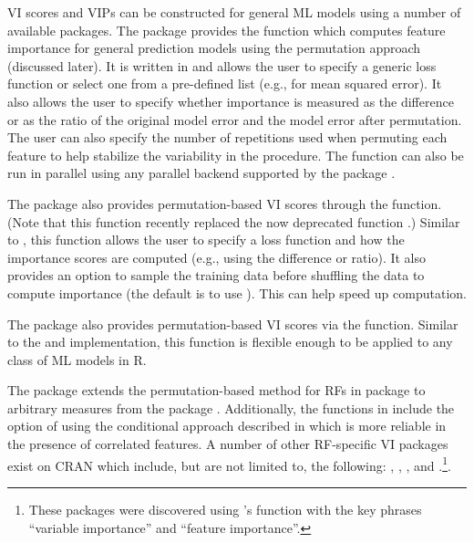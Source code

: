 VI scores and VIPs can be constructed for general ML models using a
number of available packages. The  package \citep{R-iml}
provides the  function which computes feature
importance for general prediction models using the permutation approach
(discussed later). It is written in  \citep{R-R6} and allows
the user to specify a generic loss function or select one from a
pre-defined list (e.g.,  for mean squared error). It
also allows the user to specify whether importance is measured as the
difference or as the ratio of the original model error and the model
error after permutation. The user can also specify the number of
repetitions used when permuting each feature to help stabilize the
variability in the procedure. The  function can
also be run in parallel using any parallel backend supported by the
 package \citep{R-foreach}.

The  package \citep{R-ingredients} also provides
permutation-based VI scores through the 
function. (Note that this function recently replaced the now deprecated
 function  \citep{R-DALEX}.)
Similar to , this function allows the user to
specify a loss function and how the importance scores are computed
(e.g., using the difference or ratio). It also provides an option to
sample the training data before shuffling the data to compute importance
(the default is to use ). This can help speed up
computation.

The  package \citep{R-mmpf} also provides
permutation-based VI scores via the
\newline {} function. Similar to the
 and  implementation, this function is
flexible enough to be applied to any class of ML models in R.

The  package \citep{R-varImp} extends the
permutation-based method for RFs in package 
\citep{R-party} to arbitrary measures from the 
package \citep{R-measures}. Additionally, the functions in 
include the option of using the conditional approach described in
\citet{strobl-2019-conditional} which is more reliable in the presence
of correlated features. A number of other RF-specific VI packages exist
on CRAN which include, but are not limited to, the following:
 \citep{R-vita}, 
\citep{R-rfVarImpOOB}, 
\citep{R-randomForestExplainer}, and 
\citep{R-tree.interpreter}.\footnote{These packages were discovered
  using 's  function \citep{R-pkgsearch}
  with the key phrases ``variable importance'' and ``feature
  importance''.}.

